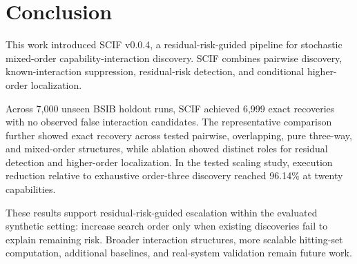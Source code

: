 \section{Conclusion}

This work introduced SCIF v0.0.4, a residual-risk-guided pipeline for stochastic mixed-order capability-interaction discovery. SCIF combines pairwise discovery, known-interaction suppression, residual-risk detection, and conditional higher-order localization.

Across 7,000 unseen BSIB holdout runs, SCIF achieved 6,999 exact recoveries with no observed false interaction candidates. The representative comparison further showed exact recovery across tested pairwise, overlapping, pure three-way, and mixed-order structures, while ablation showed distinct roles for residual detection and higher-order localization. In the tested scaling study, execution reduction relative to exhaustive order-three discovery reached 96.14\% at twenty capabilities.

These results support residual-risk-guided escalation within the evaluated synthetic setting: increase search order only when existing discoveries fail to explain remaining risk. Broader interaction structures, more scalable hitting-set computation, additional baselines, and real-system validation remain future work.
